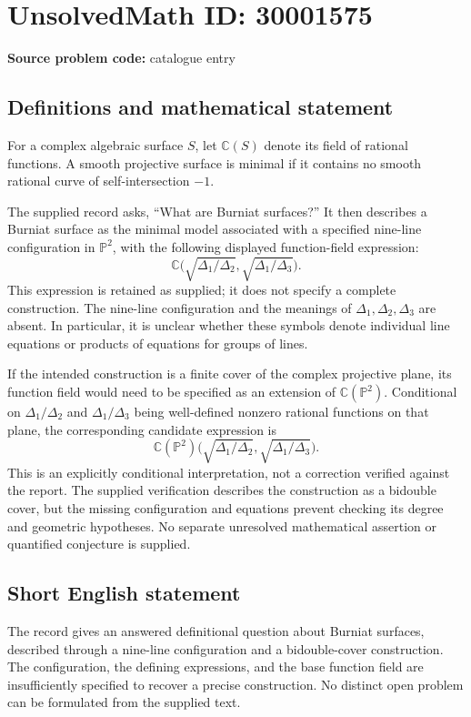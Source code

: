 \documentclass[11pt]{article}
\newcommand{\C}{\mathbb{C}}
\begin{document}
\section*{UnsolvedMath ID: 30001575}
\textbf{Source problem code:} catalogue entry
\subsection{Definitions and mathematical statement}
For a complex algebraic surface \(S\), let \(\C(S)\) denote its field of rational functions. A smooth projective surface is minimal if it contains no smooth rational curve of self-intersection \(-1\).

The supplied record asks, ``What are Burniat surfaces?'' It then describes a Burniat surface as the minimal model associated with a specified nine-line configuration in \(\mathbb{P}^{2}\), with the following displayed function-field expression:
\[
\C\bigl(\sqrt{\Delta_1/\Delta_2},\sqrt{\Delta_1/\Delta_3}\bigr).
\]
This expression is retained as supplied; it does not specify a complete construction. The nine-line configuration and the meanings of \(\Delta_1,\Delta_2,\Delta_3\) are absent. In particular, it is unclear whether these symbols denote individual line equations or products of equations for groups of lines.

If the intended construction is a finite cover of the complex projective plane, its function field would need to be specified as an extension of \(\C(\mathbb{P}^{2})\). Conditional on \(\Delta_1/\Delta_2\) and \(\Delta_1/\Delta_3\) being well-defined nonzero rational functions on that plane, the corresponding candidate expression is
\[
\C(\mathbb{P}^{2})\bigl(\sqrt{\Delta_1/\Delta_2},\sqrt{\Delta_1/\Delta_3}\bigr).
\]
This is an explicitly conditional interpretation, not a correction verified against the report. The supplied verification describes the construction as a bidouble cover, but the missing configuration and equations prevent checking its degree and geometric hypotheses. No separate unresolved mathematical assertion or quantified conjecture is supplied.
\subsection{Short English statement}
The record gives an answered definitional question about Burniat surfaces, described through a nine-line configuration and a bidouble-cover construction. The configuration, the defining expressions, and the base function field are insufficiently specified to recover a precise construction. No distinct open problem can be formulated from the supplied text.
\end{document}
